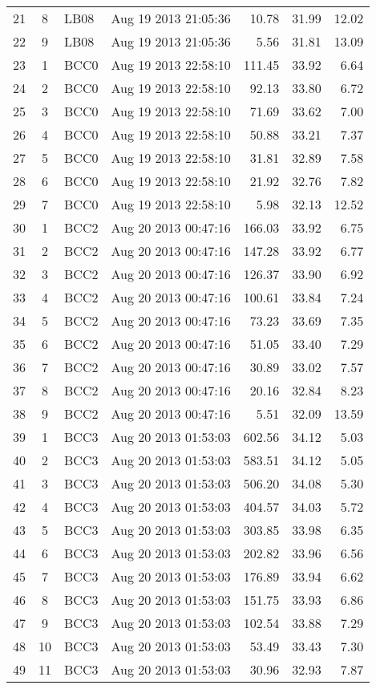 \begin{longtable}{ccllrrr}
21&8&LB08&Aug 19 2013 21:05:36&10.78&31.99&12.02\\
22&9&LB08&Aug 19 2013 21:05:36&5.56&31.81&13.09\\
\hline 
23&1&BCC0&Aug 19 2013 22:58:10&111.45&33.92&6.64\\
24&2&BCC0&Aug 19 2013 22:58:10&92.13&33.80&6.72\\
25&3&BCC0&Aug 19 2013 22:58:10&71.69&33.62&7.00\\
26&4&BCC0&Aug 19 2013 22:58:10&50.88&33.21&7.37\\
27&5&BCC0&Aug 19 2013 22:58:10&31.81&32.89&7.58\\
28&6&BCC0&Aug 19 2013 22:58:10&21.92&32.76&7.82\\
29&7&BCC0&Aug 19 2013 22:58:10&5.98&32.13&12.52\\
\hline 
30&1&BCC2&Aug 20 2013 00:47:16&166.03&33.92&6.75\\
31&2&BCC2&Aug 20 2013 00:47:16&147.28&33.92&6.77\\
32&3&BCC2&Aug 20 2013 00:47:16&126.37&33.90&6.92\\
33&4&BCC2&Aug 20 2013 00:47:16&100.61&33.84&7.24\\
34&5&BCC2&Aug 20 2013 00:47:16&73.23&33.69&7.35\\
35&6&BCC2&Aug 20 2013 00:47:16&51.05&33.40&7.29\\
36&7&BCC2&Aug 20 2013 00:47:16&30.89&33.02&7.57\\
37&8&BCC2&Aug 20 2013 00:47:16&20.16&32.84&8.23\\
38&9&BCC2&Aug 20 2013 00:47:16&5.51&32.09&13.59\\
\hline 
39&1&BCC3&Aug 20 2013 01:53:03&602.56&34.12&5.03\\
40&2&BCC3&Aug 20 2013 01:53:03&583.51&34.12&5.05\\
41&3&BCC3&Aug 20 2013 01:53:03&506.20&34.08&5.30\\
42&4&BCC3&Aug 20 2013 01:53:03&404.57&34.03&5.72\\
43&5&BCC3&Aug 20 2013 01:53:03&303.85&33.98&6.35\\
44&6&BCC3&Aug 20 2013 01:53:03&202.82&33.96&6.56\\
45&7&BCC3&Aug 20 2013 01:53:03&176.89&33.94&6.62\\
46&8&BCC3&Aug 20 2013 01:53:03&151.75&33.93&6.86\\
47&9&BCC3&Aug 20 2013 01:53:03&102.54&33.88&7.29\\
48&10&BCC3&Aug 20 2013 01:53:03&53.49&33.43&7.30\\
49&11&BCC3&Aug 20 2013 01:53:03&30.96&32.93&7.87\\

\end{longtable}
